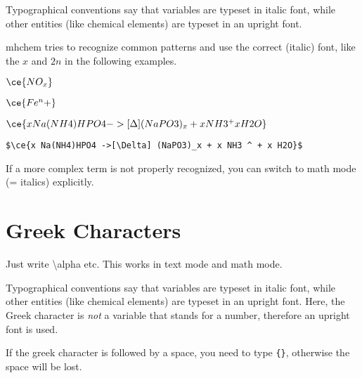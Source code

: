 \documentclass[a4paper,notitlepage,parskip=half]{scrreprt}
\newcommand\macro[1]{\mbox{\ttfamily\textbackslash#1}}
\begin{document}
Typographical conventions say that variables are typeset in italic font, while other entities (like chemical elements) are typeset in an upright font.

mhchem tries to recognize common patterns and use the correct (italic) font, like the $x$ and $2n$ in the following examples.

\begin{SideBySideExample}[xrightmargin=4cm]
  $\ce{NO_x}$ \sffamily\bfseries {}
\end{SideBySideExample}

\begin{SideBySideExample}[xrightmargin=4cm]
  $\ce{Fe^n+}$ \sffamily\bfseries {}
\end{SideBySideExample}

$\ce{x Na(NH4)HPO4 ->[\Delta] (NaPO3)_x + x NH3 ^ + x H2O}$\par
{\raggedleft\verb|$\ce{x Na(NH4)HPO4 ->[\Delta] (NaPO3)_x + x NH3 ^ + x H2O}$|\par}

If a more complex term is not properly recognized, you can switch to math mode (= italics) explicitly.


\section{Greek Characters}

Just write \macro{alpha} etc. This works in text mode and math mode.

Typographical conventions say that variables are typeset in italic font, while other entities (like chemical elements) are typeset in an upright font.
Here, the Greek character is \emph{not} a variable that stands for a number, therefore an upright font is used.

\begin{SideBySideExample}[xrightmargin=5cm]
\end{SideBySideExample}

\begin{SideBySideExample}[xrightmargin=5cm]
  \ce{[Pt(\eta^2-C2H4)Cl3]-}
\end{SideBySideExample}

If the greek character is followed by a space, you need to type \verb|{}|, otherwise the space will be lost.

\begin{SideBySideExample}[xrightmargin=5cm]
\end{SideBySideExample}
\end{document}
